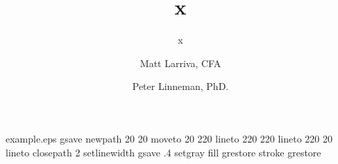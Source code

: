 \begin{filecontents*}{example.eps}
gsave
newpath
  20 20 moveto
  20 220 lineto
  220 220 lineto
  220 20 lineto
closepath
2 setlinewidth
gsave
  .4 setgray fill
grestore
stroke
grestore
\end{filecontents*}

\RequirePackage{fix-cm}
\documentclass{svjour3}                     %
\smartqed  %
\usepackage{graphicx}
\usepackage{mathptmx}      %


\usepackage{natbib}
\usepackage{csvsimple}
\usepackage{breakcites}
\usepackage{caption}
\usepackage{blindtext}
\usepackage{amsmath}
\usepackage{float}
\usepackage{graphicx}
\usepackage{geometry}
\usepackage{longtable,array}
\usepackage{subfig}
\usepackage{graphicx}
\usepackage{url}
\usepackage{pdflscape}


\title{x}
\date{}
\subtitle{x}
\author{Matt Larriva, CFA         \and
        Peter Linneman, PhD.
}




\maketitle

